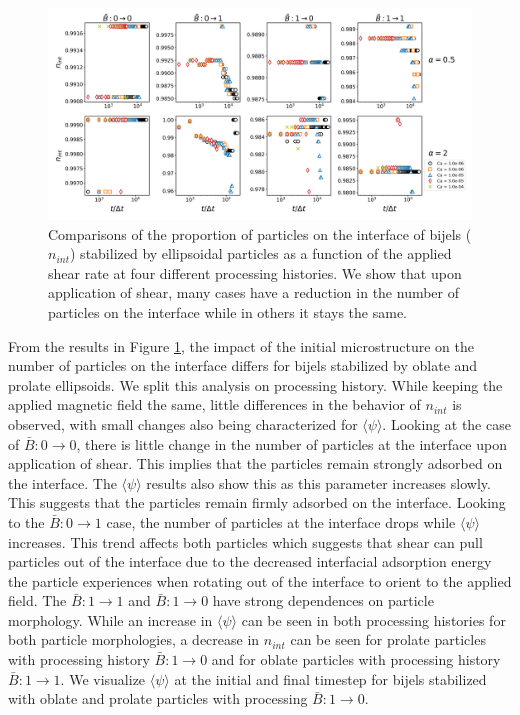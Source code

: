 \begin{figure} 
    \centering 
    \includegraphics[scale=0.3]{../figures/results/paper3/n_int-time_compare.png} 
    \caption{Comparisons of the proportion of particles on the interface of bijels ($n_{int}$) stabilized by ellipsoidal particles as a function of 
             the applied shear rate at four different processing histories. We show that upon application of shear, many cases have a 
             reduction in the number of particles on the interface while in others it stays the same. 
             } 
    \label{fig:particles_interface_prop_shear} 
\end{figure}

From the results in Figure \ref{fig:particles_interface_prop_shear}, the impact of the initial microstructure on the number of particles on the interface
differs for bijels stabilized by oblate and prolate ellipsoids. We split this analysis on processing history. While keeping the applied magnetic field
the same, little differences in the behavior of $n_{int}$ is observed, with small changes also being characterized for $\langle \psi \rangle$. 
Looking at the case of $\bar{B}:0 \rightarrow 0$, there is little change in the number of particles at the interface upon application of shear. This implies that the 
particles remain strongly adsorbed on the
interface. The $\langle \psi \rangle$ results also show this as this parameter increases slowly. This suggests that the particles remain firmly adsorbed
on the interface. Looking to the $\bar{B}:0 \rightarrow 1$ case, the number of particles at the interface drops while $\langle \psi \rangle$ increases. This
trend affects both particles which suggests that shear can pull particles out of the interface due to the decreased
interfacial adsorption energy the particle experiences when rotating out of the interface to orient to the applied field. The $\bar{B}:1 \rightarrow 1$ and 
$\bar{B}:1 \rightarrow 0$ have strong dependences on particle morphology. While an increase in $\langle \psi \rangle$ can be seen in both processing histories 
for both particle morphologies, a decrease in $n_{int}$ can be seen for prolate particles with processing history $\bar{B}:1 \rightarrow 0$ and for 
oblate particles with processing history $\bar{B}:1 \rightarrow 1$. We visualize $\langle \psi \rangle$ at the initial and final timestep for bijels stabilized with
oblate and prolate particles with processing $\bar{B}:1 \rightarrow 0$.

